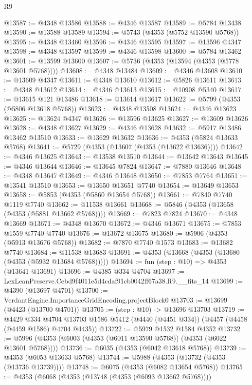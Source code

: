 \begin{lexlean}{R9}
\begin{coremodule}
@13587 := @4348 @13586
@13588 := @4346 @13587
@13589 := @5784 @13438
@13590 := @13588 @13589
@13594 := @5743 (@4353 (@5752 @13590 @5768))
@13595 := @4348 @13460
@13596 := @4346 @13595
@13597 := @13596 @4347
@13598 := @4348 @13597
@13599 := @4346 @13598
@13600 := @5784 @13462
@13601 := @13599 @13600
@13607 := @5736 (@4353 (@13594 (@4353 (@5778 @13601 @5768))))
@13608 := @4348 @13484
@13609 := @4346 @13608
@13610 := @13609 @4347
@13611 := @4348 @13610
@13612 := @5826 @13611
@13613 := @4348 @13612
@13614 := @4346 @13613
@13615 := @10908 @5340
@13617 := @13615 @121 @13486
@13618 := @13614 @13617
@13622 := @5799 (@4353 (@5806 @13618 @5768))
@13623 := @4348 @13508
@13624 := @4346 @13623
@13625 := @13624 @4347
@13626 := @13596 @13625
@13627 := @13609 @13626
@13628 := @4348 @13627
@13629 := @4346 @13628
@13632 := @5917 @13486 @13462 @13510
@13633 := @13629 @13632
@13636 := @4353 (@5824 @13633 @5768)
@13641 := @5729 (@4353 (@13607 (@4353 (@13622 @13636))))
@13642 := @4346 @13625
@13643 := @13538 @13510
@13644 := @13642 @13643
@13645 := @4346 @13644
@13646 := @13645 @7824
@13647 := @7880 @13646
@13648 := @4348 @13647
@13649 := @4346 @13648
@13650 := @7853 @7764
@13651 := @13541 @13510
@13653 := @13650 @13651 @7740
@13654 := @13649 @13653
@13658 := @5853 (@4353 (@5860 @13654 @5768))
@13661 := @7840 @7740 @1119 @7740
@13662 := @11538 @13661
@13668 := @5846 (@4353 (@13658 (@4353 (@5881 @13662 @5768))))
@13669 := @7823 @7824
@13670 := @4348 @13669
@13671 := @4348 @13670
@13672 := @4346 @13671
@13675 := @7853 @1559 @7740 @7740
@13676 := @13672 @13675
@13680 := @5906 (@4353 (@5913 @13676 @5768))
@13682 := @7870 @7740 @1573
@13683 := @13682 @7740
@13684 := @11538 @13683
@13691 := @4353 (@13668 (@4353 (@13680 (@4353 (@5932 @13684 @5768)))))
@13694 := fun (step : @10) => @4353 (@13641 @13691)
@13696 := @4385 @334 @4704
@13697 := LexLeanPreserve.Cebd9f4011e5d4cdaf91cb0042ff67a38.R9.__fits_14
@13699 := @4390 (@13697 @4701)
@13700 := VerdantEngine.ImportanceGridEncoding.projectBlock0
@13703 := @13699 (@4423 (@13700 @4701))
@13705 := (step : @10) -> @13696 @13703
@13719 := @4429
    @334
    @4704
    @13703
    @1586
    @5412
    (@4440 (@4451 @334))
    (@4457 (@4458 (@4459 @1586) @4704 @4435))
@13722 := @5979 @1532 @1584 @4352
@13732 := @5996 (@4353 (@6003 (@4353 (@6011 @13590 @5768)) (@4353 (@6022 @13601 @5768))))
@13736 := @6035 (@4353 (@6042 @13618 @5768))
@13739 := @4353 (@6053 @13633 @5768)
@13744 := @5988 (@4353 (@13732 (@4353 (@13736 @13739))))
@13748 := @6075 (@4353 (@6082 @13654 @5768))
@13765 := @4353
    (@6068
      (@4353 (@13748 (@4353 (@6093 @13662 @5768))))

\end{coremodule}
\end{lexlean}
